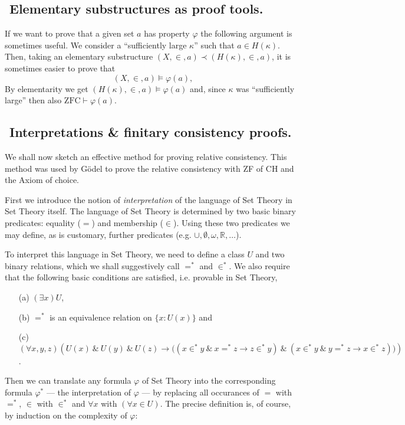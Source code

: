\subsection{${}$ \hspace{-1em} Elementary substructures as proof tools.}
If we want to prove that a given set $a$ has property $\varphi$
the following argument is sometimes useful. We consider a ``sufficiently
large $\kappa$'' such that $a\in H(\kappa)$. Then, taking an elementary
substructure $(X,\in,a)\prec (H(\kappa),\in,a)$, it is sometimes
easier to prove that
$$(X,\in,a) \vDash \varphi (a),$$
By elementarity we get $(H(\kappa),\in,a)\vDash\varphi(a)$ and, since
$\kappa$ was ``sufficiently large'' then also $\mbox{ZFC}\vdash\varphi(a)$.

\subsection{${}$ \hspace{-1em} Interpretations \& finitary consistency proofs.}

We shall now sketch an effective method for proving relative consistency. This
method was used by G\"{o}del to prove the relative consistency with ZF of CH and the
Axiom of choice.

First we introduce the notion of \emph{interpretation} of the language of Set Theory in
Set Theory itself. The language of Set Theory is determined by two basic binary predicates:
equality ($=$) and membership ($\in$). Using these two predicates we may
define, as is customary, further predicates (e.g. $\cup,\emptyset,\omega,\mathbb{R},\ldots$).

To interpret this language in Set Theory, we need to define a class $U$ and two binary relations,
which we shall suggestively call $=^*$ and $\in^*$. We also require that the following basic conditions
are satisfied, i.e. provable in Set Theory,

\begin{itemize}
 \item[(a)] $(\exists x)U$,
 \item[(b)] $\mathcal{=^*}$ is an equivalence relation on $\{x:U(x)\}$ and
 \item[(c)] $(\forall x,y,z)(U(x)\ \&\ U(y)\ \&\ U(z)\rightarrow \big((x\in^*y\ \&\ x=^*z\rightarrow z\in^*y)\ \&\
								      (x\in^*y\ \&\ y=^*z\rightarrow x\in^*z)\big))$.
\end{itemize}

Then we can translate any formula $\varphi$ of Set Theory into the corresponding formula $\varphi^*$ ---
the interpretation of $\varphi$ --- by replacing all occurances of $=$ with $=^*$, $\in$ with $\in^*$ and
$\forall x$ with $(\forall x\in U)$. The precise definition is, of course, by
induction on the complexity of $\varphi$:


